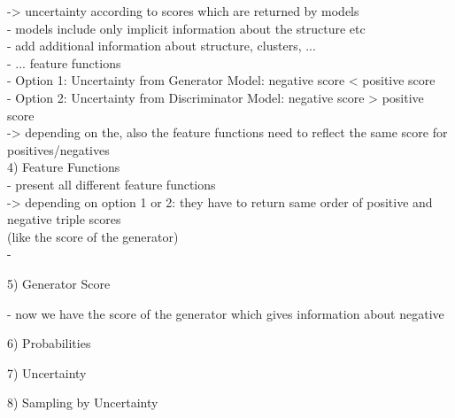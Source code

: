 -> uncertainty according to scores which are returned by models\\
- models include only implicit information about the structure etc\\
- add additional information about structure, clusters, ...\\
- ... feature functions\\

- Option 1: Uncertainty from Generator Model: negative score < positive score\\
- Option 2: Uncertainty from Discriminator Model: negative score > positive score\\
-> depending on the, also the feature functions need to reflect the same score for positives/negatives\\

4) Feature Functions\\

- present all different feature functions\\
-> depending on option 1 or 2: they have to return same order of positive and negative triple scores\\
(like the score of the generator)\\
- 

5) Generator Score

- now we have the score of the generator which gives information about negative

6) Probabilities 

7) Uncertainty


8) Sampling by Uncertainty
    








